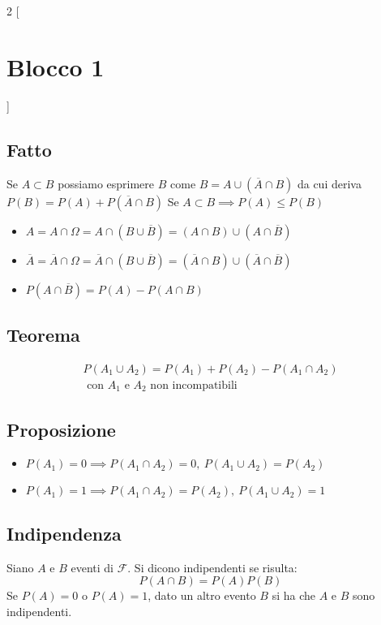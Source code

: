 \begin{multicols*}{2}
[\section*{Blocco 1}]

\subsection*{Fatto}
Se $A \subset B$ possiamo esprimere $B$ come $B = A\cup (\overline{A} \cap B)$ 
da cui deriva $P(B) = P(A) + P(\overline{A} \cap B)$
\medbreak
Se $A \subset B \implies P(A) \le P(B)$

\begin{itemize}
    \item $A = A \cap \Omega = A \cap (B \cup \overline{B}) = (A \cap B) \cup (A \cap \overline{B})$
    \item $\overline{A} = \overline{A} \cap \Omega = \overline{A} \cap (B \cup \overline{B}) = (\overline{A} \cap B) \cup (\overline{A} \cap \overline{B})$
    \item $P(A \cap \overline{B}) = P(A) - P(A \cap B)$
\end{itemize}

\subsection*{Teorema}
\begin{align*}
P(A_1 \cup A_2) = P(A_1) + P(A_2) - P(A_1 \cap A_2) \\\text{ con $A_1$ e $A_2$ non incompatibili}
\end{align*}

\subsection*{Proposizione}
\begin{itemize}
    \item $P(A_1) = 0 \implies P(A_1 \cap A_2) = 0, \ P(A_1 \cup A_2) = P(A_2)$
    \item $P(A_1) = 1 \implies P(A_1 \cap A_2) = P(A_2), \ P(A_1 \cup A_2) = 1$
\end{itemize}

\subsection*{Indipendenza}
Siano $A$ e $B$ eventi di $\mathscr{F}$. Si dicono indipendenti se risulta:
$$P(A \cap B) = P(A)P(B)$$
Se $P(A) = 0$ o $P(A) = 1$, dato un altro evento $B$ si ha che $A$ e $B$ sono indipendenti.


\end{multicols*}
